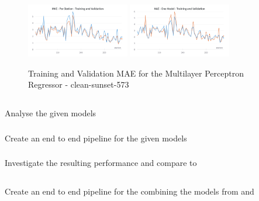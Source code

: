 \documentclass[a4paper]{article}
\begin{document}
    \begin{figure}[h]
        \centering
        \includegraphics[width=0.4\textwidth]{model-per-station-clean-sunset}\hfill
        \includegraphics[width=0.4\textwidth]{onemodel-clean-sunset}
        \caption{Training and Validation MAE for the Multilayer Perceptron Regressor - clean-sunset-573}
        \label{fig:clean-sunset}
    \end{figure}


    \subsection*{}
    \subsubsection*{} Analyse the given models
    \subsubsection*{} Create an end to end pipeline for the given models
    \subsubsection*{} Investigate the resulting performance and compare to 

    \subsection*{}
    \subsubsection*{} Create an end to end pipeline for the combining the models from  and 
\end{document}

